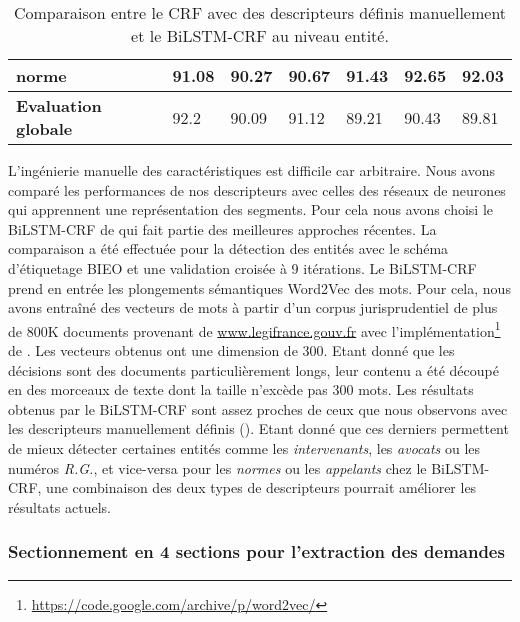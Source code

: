 \begin{table}[!ht]
\begin{tabular}{|l|l|l|l|l|l|l|}
		\textbf{norme}         & 91.08              & 90.27                               & 90.67       & 91.43              & 92.65                & 92.03       \\ \hline
		\noalign{\smallskip}\hline\noalign{\smallskip}
		\textbf{Evaluation globale} & 92.2               & 90.09                               & 91.12       & 89.21              & 90.43                & 89.81       \\ \hline
	\end{tabular}
	\caption{Comparaison entre le CRF avec des descripteurs définis manuellement et le BiLSTM-CRF au niveau entité.}\label{tab:structuration:perf-bilstmcrf}
\end{table}

L'ingénierie manuelle des caractéristiques est difficile car arbitraire. Nous avons comparé les performances de nos descripteurs avec celles des réseaux de neurones qui apprennent une représentation des segments. Pour cela nous avons choisi le BiLSTM-CRF de \citet{lample2016nnner} qui fait partie des meilleures approches récentes. La comparaison a été effectuée pour la détection des entités avec le schéma d'étiquetage BIEO et une validation croisée à 9 itérations. Le BiLSTM-CRF prend en entrée les plongements sémantiques Word2Vec \citep{mikolov2013word2vec} des mots. Pour cela, nous avons entraîné des vecteurs de mots à partir d'un corpus jurisprudentiel de plus de 800K documents provenant de \url{www.legifrance.gouv.fr} avec l'implémentation\footnote{\url{https://code.google.com/archive/p/word2vec/}} de \citet{mikolov2013word2vec}. Les vecteurs obtenus ont une dimension de 300. Etant donné que les décisions sont des documents particulièrement longs, leur contenu a été découpé en des morceaux de texte dont la taille n'excède pas 300 mots. Les résultats obtenus par le BiLSTM-CRF sont assez proches de ceux que nous observons avec les descripteurs manuellement définis (). Etant donné que ces derniers permettent de mieux détecter certaines entités comme les \textit{intervenants}, les \textit{avocats} ou les numéros \textit{R.G.}, et vice-versa pour les \textit{normes} ou les \textit{appelants} chez le BiLSTM-CRF, une combinaison des deux types de descripteurs pourrait améliorer les résultats actuels. %
 
\subsubsection{Sectionnement en 4 sections pour l'extraction des demandes}
\label{sec:structuration:sectionnement-en-4}

